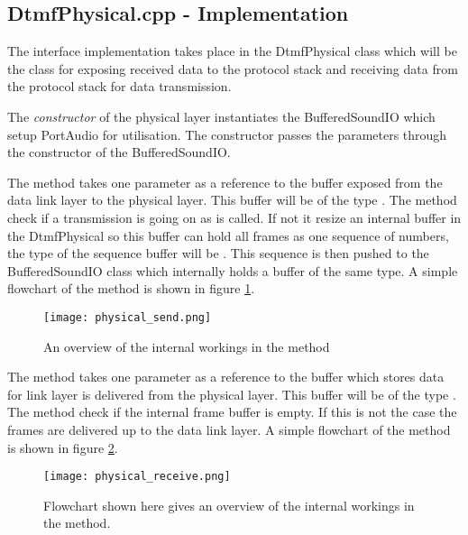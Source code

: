 	\subsection{DtmfPhysical.cpp - Implementation}
	The interface implementation takes place in the DtmfPhysical class which will be the class for exposing received data to the protocol stack
	and receiving data from the protocol stack for data transmission.
	
	The \textit{constructor} of the physical layer instantiates the BufferedSoundIO which setup PortAudio for utilisation. The constructor passes the
	parameters through the constructor of the BufferedSoundIO.
	
	The  method takes one parameter as a reference to the buffer exposed from the data link layer to the physical layer. This buffer
	will be of the type . The  method check if a transmission is going on as  is called.
	If not it resize an internal buffer in the DtmfPhysical so this buffer can hold all frames as one sequence of numbers, the type of 
	the sequence buffer will be . This sequence is then pushed to the BufferedSoundIO class which
	internally holds a buffer of the same type. A simple flowchart of the  method is shown in figure \ref{fig:physical_send}.
	
	\begin{figure}[htb]
		\begin{center}
		\texttt{[image: physical\_send.png]}%
		\caption{An overview of the internal workings in the  method}
		\label{fig:physical_send}
		\end{center}
	\end{figure}
	
	The  method takes one parameter as a reference to the buffer which stores data for link layer is delivered from the physical layer.
	This buffer	will be of the type . The  method check if the internal frame buffer is empty.
	If this is not the case the frames are delivered up to the data link layer. A simple flowchart of the  method is shown in figure \ref{fig:physical_receive}.
	
	\begin{figure}[htb]
		\begin{center}
		\texttt{[image: physical\_receive.png]}%
		\caption{Flowchart shown here gives an overview of the internal workings in the  method.}
		\label{fig:physical_receive}
		\end{center}
	\end{figure}
	
